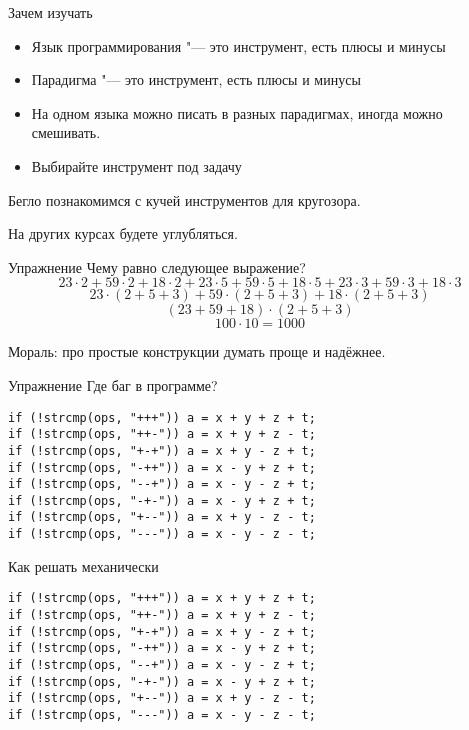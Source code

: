 \begin{frame}[t,fragile]{Зачем изучать}
	\begin{itemize}
	\item Язык программирования "--- это инструмент, есть плюсы и минусы
	\item Парадигма "--- это инструмент, есть плюсы и минусы
	\item	На одном языка можно писать в разных парадигмах, иногда можно смешивать.
	\item Выбирайте инструмент под задачу
	\end{itemize}
	Бегло познакомимся с кучей инструментов для кругозора.

	На других курсах будете углубляться.
\end{frame}

\begin{frame}[t,fragile]{Упражнение}
	Чему равно следующее выражение?
	\[
	23 \cdot 2 + 59 \cdot 2 + 18 \cdot 2 +
	23 \cdot 5 + 59 \cdot 5 + 18 \cdot 5 +
	23 \cdot 3 + 59 \cdot 3 + 18 \cdot 3
	\]
	\pause
	\[
	23 \cdot (2 + 5 + 3) + 59 \cdot (2 + 5 + 3) + 18 \cdot (2 + 5 + 3)
	\]
	\pause
	\[
	(23 + 59 + 18) \cdot (2 + 5 + 3)
	\]
	\pause
	\[
	100 \cdot 10 = 1000
	\]

	Мораль: про простые конструкции думать проще и надёжнее.
\end{frame}

\begin{frame}[t,fragile]{Упражнение}
	Где баг в программе?
\begin{verbatim}
if (!strcmp(ops, "+++")) a = x + y + z + t;
if (!strcmp(ops, "++-")) a = x + y + z - t;
if (!strcmp(ops, "+-+")) a = x + y - z + t;
if (!strcmp(ops, "-++")) a = x - y + z + t;
if (!strcmp(ops, "--+")) a = x - y - z + t;
if (!strcmp(ops, "-+-")) a = x - y + z + t;
if (!strcmp(ops, "+--")) a = x + y - z - t;
if (!strcmp(ops, "---")) a = x - y - z - t;
\end{verbatim}
\end{frame}

\begin{frame}[t,fragile]{Как решать механически}
\begin{verbatim}
if (!strcmp(ops, "+++")) a = x + y + z + t;
if (!strcmp(ops, "++-")) a = x + y + z - t;
if (!strcmp(ops, "+-+")) a = x + y - z + t;
if (!strcmp(ops, "-++")) a = x - y + z + t;
if (!strcmp(ops, "--+")) a = x - y - z + t;
if (!strcmp(ops, "-+-")) a = x - y + z + t;
if (!strcmp(ops, "+--")) a = x + y - z - t;
if (!strcmp(ops, "---")) a = x - y - z - t;
\end{verbatim}
\end{frame}

